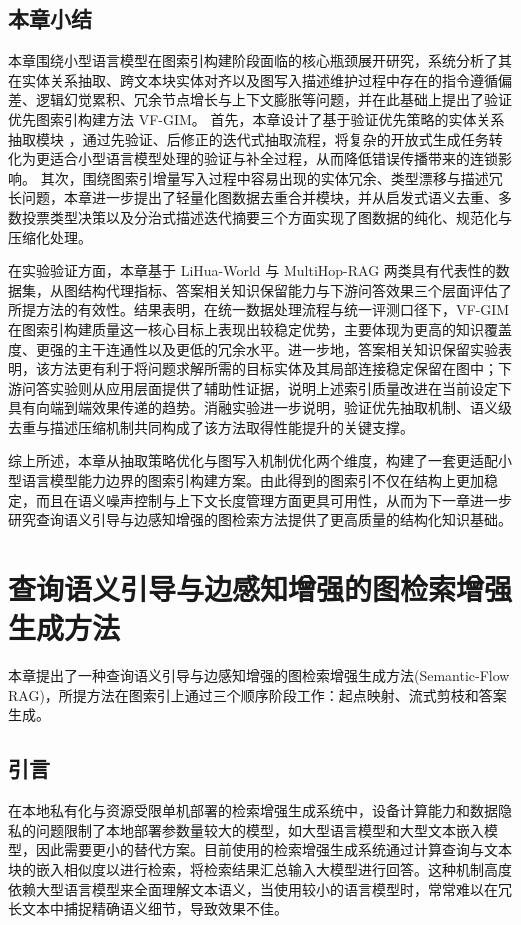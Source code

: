\documentclass[promaster, vlined]{DissertUESTC}
\begin{document}
\section{本章小结}

本章围绕小型语言模型在图索引构建阶段面临的核心瓶颈展开研究，系统分析了其在实体关系抽取、跨文本块实体对齐以及图写入描述维护过程中存在的指令遵循偏差、逻辑幻觉累积、冗余节点增长与上下文膨胀等问题，并在此基础上提出了验证优先图索引构建方法 VF-GIM。
首先，本章设计了基于验证优先策略的实体关系抽取模块 ，通过先验证、后修正的迭代式抽取流程，将复杂的开放式生成任务转化为更适合小型语言模型处理的验证与补全过程，从而降低错误传播带来的连锁影响。
其次，围绕图索引增量写入过程中容易出现的实体冗余、类型漂移与描述冗长问题，本章进一步提出了轻量化图数据去重合并模块，并从启发式语义去重、多数投票类型决策以及分治式描述迭代摘要三个方面实现了图数据的纯化、规范化与压缩化处理。

在实验验证方面，本章基于 LiHua-World 与 MultiHop-RAG 两类具有代表性的数据集，从图结构代理指标、答案相关知识保留能力与下游问答效果三个层面评估了所提方法的有效性。结果表明，在统一数据处理流程与统一评测口径下，VF-GIM 在图索引构建质量这一核心目标上表现出较稳定优势，主要体现为更高的知识覆盖度、更强的主干连通性以及更低的冗余水平。进一步地，答案相关知识保留实验表明，该方法更有利于将问题求解所需的目标实体及其局部连接稳定保留在图中；下游问答实验则从应用层面提供了辅助性证据，说明上述索引质量改进在当前设定下具有向端到端效果传递的趋势。消融实验进一步说明，验证优先抽取机制、语义级去重与描述压缩机制共同构成了该方法取得性能提升的关键支撑。

综上所述，本章从抽取策略优化与图写入机制优化两个维度，构建了一套更适配小型语言模型能力边界的图索引构建方案。由此得到的图索引不仅在结构上更加稳定，而且在语义噪声控制与上下文长度管理方面更具可用性，从而为下一章进一步研究查询语义引导与边感知增强的图检索方法提供了更高质量的结构化知识基础。



\chapter{查询语义引导与边感知增强的图检索增强生成方法}
本章提出了一种查询语义引导与边感知增强的图检索增强生成方法(Semantic-Flow RAG)，所提方法在图索引上通过三个顺序阶段工作：起点映射、流式剪枝和答案生成。
\section{引言}
在本地私有化与资源受限单机部署的检索增强生成系统中，设备计算能力和数据隐私的问题限制了本地部署参数量较大的模型，如大型语言模型和大型文本嵌入模型，因此需要更小的替代方案。目前使用的检索增强生成系统通过计算查询与文本块的嵌入相似度以进行检索，将检索结果汇总输入大模型进行回答。这种机制高度依赖大型语言模型来全面理解文本语义，当使用较小的语言模型时，常常难以在冗长文本中捕捉精确语义细节，导致效果不佳。
\end{document}
